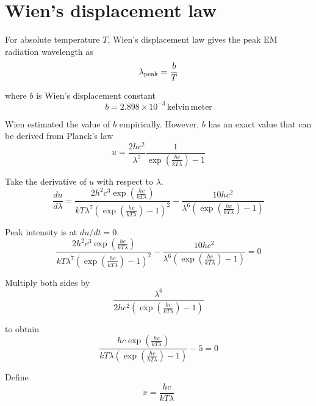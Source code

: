 

\section*{Wien's displacement law}

For absolute temperature $T$, Wien's displacement law gives
the peak EM radiation wavelength as
\begin{equation*}
\lambda_{\rm peak}=\frac{b}{T}
\end{equation*}

where $b$ is Wien's displacement constant
\begin{equation*}
b=2.898\times10^{-3}\,\text{kelvin}\,\text{meter}
\end{equation*}

Wien estimated the value of $b$ empirically.
However, $b$ has an exact value that can be derived from Planck's law
\begin{equation*}
u=\frac{2hc^2}{\lambda^5}\frac{1}{\exp\left(\frac{hc}{kT\lambda}\right)-1}
\end{equation*}

Take the derivative of $u$ with respect to $\lambda$.
\begin{equation*}
\frac{du}{d\lambda}
=\frac{2h^2c^3\exp\left(\frac{hc}{kT\lambda}\right)}
{kT\lambda^7\left(\exp\left(\frac{hc}{kT\lambda}\right)-1\right)^2}
-\frac{10hc^2}{\lambda^6\left(\exp\left(\frac{hc}{kT\lambda}\right)-1\right)}
\end{equation*}

Peak intensity is at $du/dt=0$.
\begin{equation*}
\frac{2h^2c^3\exp\left(\frac{hc}{kT\lambda}\right)}
{kT\lambda^7\left(\exp\left(\frac{hc}{kT\lambda}\right)-1\right)^2}
-\frac{10hc^2}{\lambda^6\left(\exp\left(\frac{hc}{kT\lambda}\right)-1\right)}=0
\end{equation*}

Multiply both sides by
\begin{equation*}
\frac{\lambda^6}{2hc^2\left(\exp\left(\frac{hc}{kT\lambda}\right)-1\right)}
\end{equation*}

to obtain
\begin{equation*}
\frac{hc\exp\left(\frac{hc}{kT\lambda}\right)}
{kT\lambda\left(\exp\left(\frac{hc}{kT\lambda}\right)-1\right)}-5=0
\end{equation*}

Define
\begin{equation*}
x=\frac{hc}{kT\lambda}
\end{equation*}

